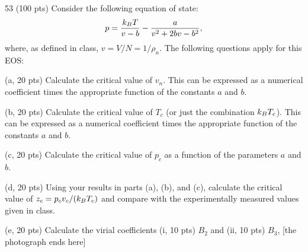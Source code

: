 \begin{hwproblem}{5}{3}
(100 pts) Consider the following equation of state:
\begin{equation}
  p = \frac{k_{B} T}{v-b}-\frac{a}{v^2+2bv-b^2},
\end{equation}
where, as defined in class, $v = V/N = 1/\rho_n$. The following questions apply for this EOS:
\begin{hwparts}
  \item (a, 20 pts) Calculate the critical value of $v_n$. This can be expressed as a numerical coefficient times the
    appropriate function of the constants $a$ and $b$.
  \item (b, 20 pts) Calculate the critical value of $T_c$ (or just the combination $k_{B} T_c$). This can be expressed as
    a numerical coefficient times the appropriate function of the constants $a$ and $b$.
  \item (c, 20 pts) Calculate the critical value of $p_c$ as a function of the parameters $a$ and $b$.
  \item (d, 20 pts) Using your results in parts (a), (b), and (c), calculate the critical value of
    $z_c = p_cv_c/(k_{B} T_c)$ and compare with the experimentally measured values given in class.
  \item (e, 20 pts) Calculate the virial coefficients (i, 10 pts) $B_2$ and (ii, 10 pts) $B_3$, [the photograph ends
    here]
\end{hwparts}
\end{hwproblem}
